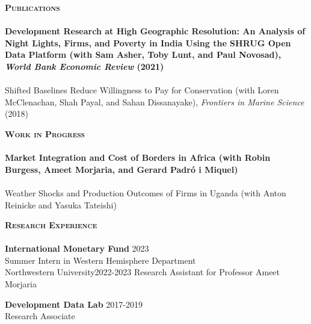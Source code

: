 \documentclass[11pt]{article}
\newcommand{\lineunder}{\vspace*{-8pt} \\ \hspace*{-18pt} \hrulefill \\}
\newcommand{\header}[1]{{\hspace*{-15pt}\vspace*{6pt} \textsc{#1}} \vspace*{-6pt} \lineunder}
\newcommand{\schoolwithcourses}[4]{
 \textbf{#1} \hfill{#2}\\
    #3\\
\vspace*{5pt}
}
\begin{document}
\vspace{1mm}



\header{\textbf{Publications}}
\schoolwithcourses{Development Research at High Geographic Resolution: An Analysis of Night Lights, Firms, and Poverty in India Using the SHRUG Open Data Platform \textnormal{(with Sam Asher, Toby Lunt, and Paul Novosad), \textit{World Bank Economic Review} (2021)}}{}{~\vspace{-3mm}}  

\schoolwithcourses{Shifted Baselines Reduce Willingness to Pay for Conservation \textnormal{(with Loren McClenachan, Shah Payal, and Sahan Dissanayake), \textit{Frontiers in Marine Science} (2018)}}{}{~\vspace{-3mm}} 

\hfill{}



\clearpage
\header{\textbf{Work in Progress}}

\schoolwithcourses{Market Integration and Cost of Borders in Africa \textnormal{(with Robin Burgess, Ameet Morjaria, and Gerard Padr\'{o} i Miquel)}}{}{~\vspace{-3mm}}

\schoolwithcourses{Weather Shocks and Production Outcomes of Firms in Uganda \textnormal{(with Anton Reinicke and Yasuka Tateishi)}}{}{~\vspace{-3mm}}{}




\header{\textbf{Research Experience}}
\schoolwithcourses{International Monetary Fund}{2023}{\hspace{2mm} Summer Intern in Western Hemisphere Department}

\schoolwithcourses{Northwestern University}{2022-2023}{\hspace{2mm} Research Assistant for Professor Ameet Morjaria}

\schoolwithcourses{Development Data Lab}{2017-2019}{\hspace{2mm} Research Associate}
\hfill{}
\vspace{1mm}
\end{document}
